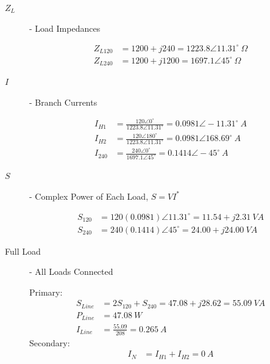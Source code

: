 \begin{description}
\begin{description}
	\item[$Z_L$] - Load Impedances
	      \begin{center}
		      \begin{align*}
			      Z_{L120} & = 1200 + j240 = 1223.8\angle 11.31^\circ \ \Omega \\
			      Z_{L240} & = 1200 + j1200 = 1697.1\angle 45^\circ \ \Omega
		      \end{align*}
	      \end{center}

	\item[$I$] - Branch Currents
	      \begin{center}
		      \begin{align*}
			      I_{H1}  & = \frac{120\angle 0^\circ}{1223.8\angle 11.31^\circ} = 0.0981\angle -11.31^\circ \ A   \\
			      I_{H2}  & = \frac{120\angle 180^\circ}{1223.8\angle 11.31^\circ} = 0.0981\angle 168.69^\circ \ A \\
			      I_{240} & = \frac{240\angle 0^\circ}{1697.1\angle 45^\circ} = 0.1414\angle -45^\circ \ A
		      \end{align*}
	      \end{center}

	\item[$S$] - Complex Power of Each Load, $S = VI^*$
	      \begin{center}
		      \begin{align*}
			      S_{120} & = 120(0.0981)\angle 11.31^\circ = 11.54 + j2.31 \ VA \\
			      S_{240} & = 240(0.1414)\angle 45^\circ = 24.00 + j24.00 \ VA
		      \end{align*}
	      \end{center}

	\item[Full Load] - All Loads Connected
	      \begin{center}
		      Primary:
		      \begin{align*}
			      S_{Line} & = 2S_{120} + S_{240} = 47.08 + j28.62 = 55.09 \ VA \\
			      P_{Line} & = 47.08 \ W                                        \\
			      I_{Line} & = \frac{55.09}{208} = 0.265 \ A
		      \end{align*}
		      Secondary:
		      \begin{align*}
			      I_{N} & = I_{H1} + I_{H2} = 0 \ A
		      \end{align*}
	      \end{center}


\end{description}
\end{description}
